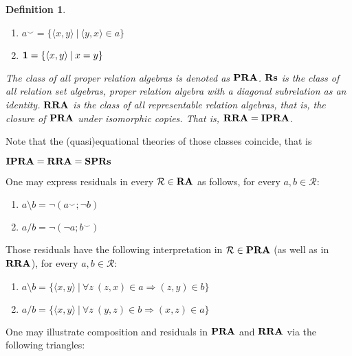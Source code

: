 \documentclass[a4paper]{article}
\theoremstyle{defin}
\newtheorem{defin}{Definition}
\theoremstyle{theorem}
\theoremstyle{prop}
\theoremstyle{lemma}
\theoremstyle{ex}
\theoremstyle{col}
\begin{document}
\begin{defin}
\begin{enumerate}
\begin{enumerate}
    \item $a^{\smile} = \{ \langle x, y \rangle \: | \: \langle y, x \rangle \in a \}$
    \item ${\bf 1} = \{ \langle x, y \rangle \: | \: x = y \}$
    \end{enumerate}
      The class of all proper relation algebras is denoted as ${\bf PRA}$. ${\bf Rs}$ is the class of all relation set algebras, proper relation algebra with a diagonal subrelation as an identity. ${\bf RRA}$ is the class of all representable relation algebras, that is, the closure of ${\bf PRA}$ under isomorphic copies. That is,
      ${\bf RRA} = {\bf IPRA}$.
  \end{enumerate}
\end{defin}
Note that the (quasi)equational theories of those classes coincide, that is
\begin{center}
  ${\bf IPRA} = {\bf RRA} = {\bf SP}{\bf Rs}$
\end{center}

One may express residuals in every $\mathcal{R} \in {\bf RA}$ as follows, for every $a, b \in \mathcal{R}$:

\begin{enumerate}
  \item $a \setminus b = \neg (a^{\smile} ; \neg b)$
  \item $a / b = \neg (\neg a ; b^{\smile})$
\end{enumerate}

Those residuals have the following interpretation in $\mathcal{R} \in {\bf PRA}$ (as well as in ${\bf RRA}$), for every $a, b \in \mathcal{R}$:
\begin{enumerate}
  \item $a \setminus b = \{ \langle x, y \rangle \: | \: \forall z \: (z, x) \in a \Rightarrow (z, y) \in b \}$
  \item $a / b = \{ \langle x, y \rangle \: | \: \forall z \: (y, z) \in b \Rightarrow (x, z) \in a \}$
\end{enumerate}
One may illustrate composition and residuals in ${\bf PRA}$ and ${\bf RRA}$ via the following triangles:

\end{document}
